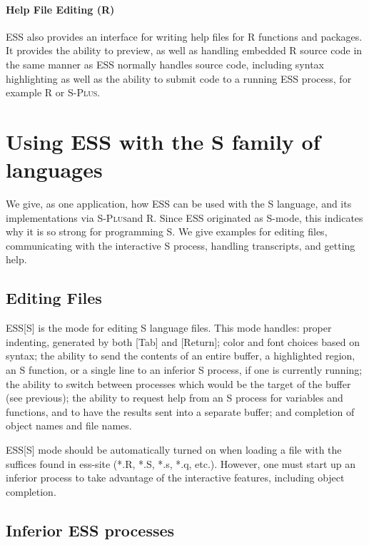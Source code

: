 \documentclass{article}
\newcommand*{\Splus}{\textsc{S-Plus}}
\begin{document}
\paragraph{Help File Editing (R)}
ESS also provides an interface for writing help files for R functions
and packages.  It provides the ability to preview, as well as handling
embedded R source code in the same manner as ESS normally handles
source code, including syntax highlighting as well as the ability to
submit code to a running ESS process, for example R or \Splus.

\section{Using ESS with the S family of languages}
\label{sec:S}

We give, as one application, how ESS can be used with the S language,
and its implementations via \Splus and R.  Since ESS originated as
S-mode, this indicates why it is so strong for programming S.  We give
examples for editing files, communicating with the interactive S
process, handling transcripts, and getting help.

\subsection{Editing Files}
\label{sec:S:edit}

ESS[S] is the mode for editing S language files.  This mode handles:
proper indenting, generated by both [Tab] and [Return]; color and font
choices based on syntax; the ability to send the contents of an entire
buffer, a highlighted region, an S function, or a single line to an
inferior S process, if one is currently running; the ability to switch
between processes which would be the target of the buffer (see
previous); the ability to request help from an S process for variables
and functions, and to have the results sent into a separate buffer;
and completion of object names and file names.

ESS[S] mode should be automatically turned on when loading a file with
the suffices found in ess-site (*.R, *.S, *.s, *.q, etc.).  However,
one must start up an inferior process to take advantage of the
interactive features, including object completion.

\subsection{Inferior ESS processes}
\label{sec:S:inf}
\end{document}
